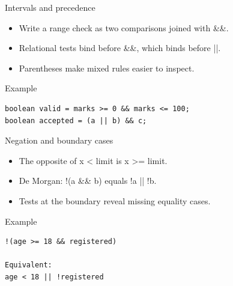 \documentclass[10pt,aspectratio=169]{beamer}
\begin{document}
\begin{frame}[fragile,t]{Intervals and precedence}
\begin{itemize}
\item Write a range check as two comparisons joined with \&\&.
\item Relational tests bind before \&\&, which binds before ||.
\item Parentheses make mixed rules easier to inspect.
\end{itemize}
\vspace{1mm}\begin{block}{Example}
\begin{lstlisting}
boolean valid = marks >= 0 && marks <= 100;
boolean accepted = (a || b) && c;
\end{lstlisting}
\end{block}
\end{frame}

\begin{frame}[fragile,t]{Negation and boundary cases}
\begin{itemize}
\item The opposite of x \textless{} limit is x \textgreater{}= limit.
\item De Morgan: !(a \&\& b) equals !a || !b.
\item Tests at the boundary reveal missing equality cases.
\end{itemize}
\vspace{1mm}\begin{block}{Example}
\begin{lstlisting}
!(age >= 18 && registered)

Equivalent:
age < 18 || !registered
\end{lstlisting}
\end{block}
\end{frame}
\end{document}
